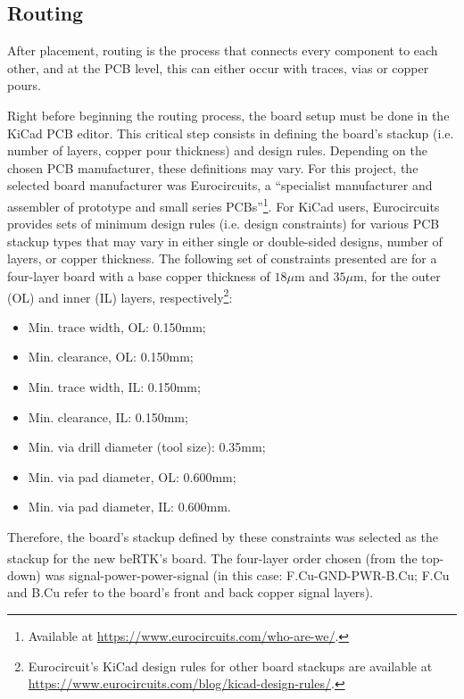 \subsection{Routing}\label{sec:52_Routing}

After placement, routing is the process that connects every component to each other, and at the PCB level, this can either occur with traces, vias or copper pours.

Right before beginning the routing process, the board setup must be done in the KiCad PCB editor. This critical step consists in defining the board's stackup (i.e. number of layers, copper pour thickness) and design rules. Depending on the chosen PCB manufacturer, these definitions may vary. For this project, the selected board manufacturer was Eurocircuits, a ``specialist manufacturer and assembler of prototype and small series PCBs''\footnote[19]{Available at \url{https://www.eurocircuits.com/who-are-we/}.}. For KiCad users, Eurocircuits provides sets of minimum design rules (i.e. design constraints) for various PCB stackup types that may vary in either single or double-sided designs, number of layers, or copper thickness. The following set of constraints presented are for a four-layer board with a base copper thickness of $18 \mu$m and $35 \mu$m, for the outer (OL) and inner (IL) layers, respectively\footnote[20]{Eurocircuit's KiCad design rules for other board stackups are available at \url{https://www.eurocircuits.com/blog/kicad-design-rules/}.}:
\begin{itemize}
	\item Min. trace width, OL: 0.150mm;
	
	\item Min. clearance, OL: 0.150mm;
	
	\item Min. trace width, IL: 0.150mm;
	
	\item Min. clearance, IL: 0.150mm;

	\item Min. via drill diameter (tool size): 0.35mm;
	
	\item Min. via pad diameter, OL: 0.600mm;
	
	\item Min. via pad diameter, IL: 0.600mm.
\end{itemize}
Therefore, the board's stackup defined by these constraints was selected as the stackup for the new beRTK\textsuperscript{\textregistered}'s board. The four-layer order chosen (from the top-down) was signal-power-power-signal (in this case: F.Cu-GND-PWR-B.Cu; F.Cu and B.Cu refer to the board's front and back copper signal layers).

